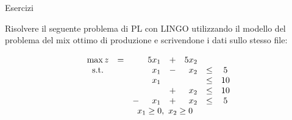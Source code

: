 \documentclass{beamer}
\begin{document}
\generatitolo

\def\rombo{$$
\begin{array}{cccrcrcc}
	\max z	&=	& 	&5 x_{1}	&+&5 x_{2}\\
	\mbox{s.t.}	&	& & x_{1}	&-& x_{2}	&\leq	& 5\\
				&	& & x_{1}	& &     	&\leq	&10\\
				&	& &			&+& x_{2}	&\leq	&10\\
				&	&-& x_{1}	&+& x_{2}	&\leq	& 5\\
	&	&\multicolumn{4}{c}{x_{1} \geq 0,\ x_{2}\geq 0}
\end{array}
$$}

\begin{frame}%
{Esercizi}

Risolvere il seguente problema di PL con LINGO
utilizzando il modello del problema del mix ottimo
di produzione e scrivendone i dati sullo stesso
file:

\begin{enumerate}
{\footnotesize \item \rombo}
\end{enumerate}

\end{frame}
\end{document}
